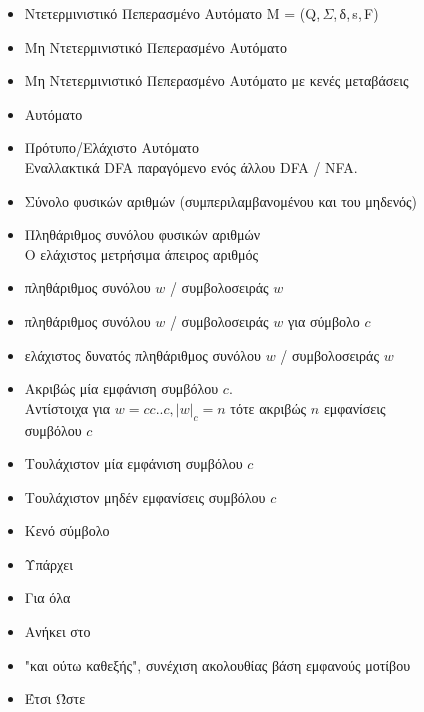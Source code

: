 \begin{itemize}
	\item{ Ντετερμινιστικό Πεπερασμένο Αυτόματο Μ = (Q,\,$\Sigma$,\,δ,\,s,\,F)}
	\item{ Μη Ντετερμινιστικό Πεπερασμένο Αυτόματο}
	\item{ Μη Ντετερμινιστικό Πεπερασμένο Αυτόματο με κενές μεταβάσεις}
	\item{ Αυτόματο}
	\item{ Πρότυπο/Ελάχιστο Αυτόματο\\
		\makebox[2.15cm]{\hfill}Εναλλακτικά DFA παραγόμενο ενός άλλου DFA / NFA.}
	\item{ Σύνολο φυσικών αριθμών (συμπεριλαμβανομένου και του μηδενός)}
	\item{ Πληθάριθμος συνόλου φυσικών αριθμών\\
		\makebox[2.15cm]{\hfill}Ο ελάχιστος μετρήσιμα άπειρος αριθμός}
	\item{ πληθάριθμος συνόλου $w$ / συμβολοσειράς $w$}
	\item{ πληθάριθμος συνόλου $w$ / συμβολοσειράς $w$ για σύμβολο $c$}
	\item{ ελάχιστος δυνατός πληθάριθμος συνόλου $w$ / συμβολοσειράς $w$}
	\item{ Ακριβώς μία εμφάνιση συμβόλου $c$.\\
		\makebox[2.15cm]{\hfill}Αντίστοιχα για $w = cc..c, \vert w \vert_c = n$ τότε ακριβώς $n$ εμφανίσεις\\
		\makebox[2.15cm]{\hfill}συμβόλου $c$}
	\item{ Τουλάχιστον μία εμφάνιση συμβόλου $c$}
	\item{ Τουλάχιστον μηδέν εμφανίσεις συμβόλου $c$}
	\item{ Κενό σύμβολο}
	\item{\makebox[2cm]{$\exists$ \hfill} Υπάρχει}
	\item{\makebox[2cm]{$\forall$ \hfill} Για όλα}
	\item{\makebox[2cm]{$\in$ \hfill} Ανήκει στο}
	\item{\makebox[2cm]{$\dots$ \hfill} "και ούτω καθεξής", συνέχιση ακολουθίας βάση εμφανούς μοτίβου}
	\item{ Έτσι Ώστε}

\end{itemize}
